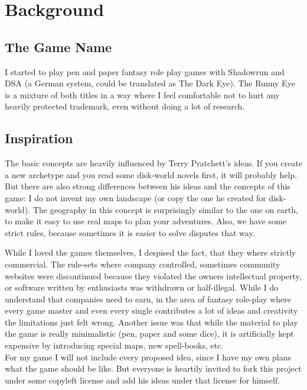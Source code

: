 \chapter{Background}
\section{The Game Name}
I started to play pen and paper fantasy role play games with Shadowrun and DSA (a German system, could be translated as The Dark Eye).  The Runny Eye is a mixture of both titles in a way where I feel comfortable not to hurt any heavily protected trademark, even without doing a lot of research.

\section{Inspiration}
The basic concepts are heavily influenced by Terry Pratchett's ideas. If you create a new archetype and you read some disk-world novels first, it will probably help. But there are also strong differences between his ideas and the concepts of this game: I do not invent my own landscape (or copy the one he created for disk-world). The geography in this concept is surprisingly similar to the one on earth, to make it easy to use real maps to plan your adventures. Also, we have some strict rules, because sometimes it is easier to solve disputes that way.

While I loved the games themselves, I despised the fact, that they where strictly commercial. The rule-sets where company controlled, sometimes community websites were discontinued because they violated the owners intellectual property, or software written by enthusiasts was withdrawn or half-illegal. While I do understand that companies need to earn, in the area of fantasy role-play where every game master and even every single contributes a lot of ideas and creativity the limitations just felt wrong. Another issue was that while the material to play the game is really minimalistic (pen, paper and some dice), it is artificially kept expensive by introducing special maps, new spell-books, etc.
\\
For my game I will not include every proposed idea, since I have my own plans what the game should be like. But everyone is heartily invited to fork this project under some copyleft license and add his ideas under that license for himself.

